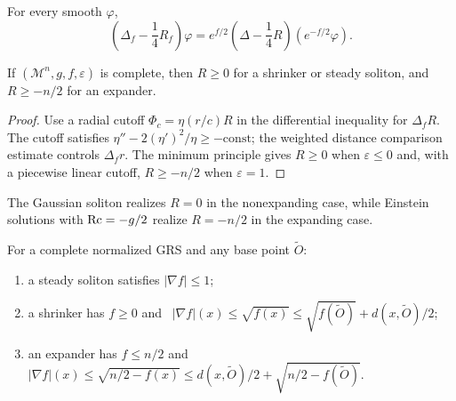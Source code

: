 \begin{claim}
\label{ex:chow-iv-weighted-conjugation}
For every smooth $\varphi$,
\[
\left(\Delta_f-\frac14R_f\right)\varphi
=e^{f/2}\left(\Delta-\frac14R\right)(e^{-f/2}\varphi).
\]
\end{claim}

\begin{theorem}
\label{thm:chow-iv-scalar-curvature-lower-bound}
If $(\mathcal M^n,g,f,\varepsilon)$ is complete, then $R\ge0$ for a shrinker
or steady soliton, and $R\ge-n/2$ for an expander.
\end{theorem}
\begin{proof}
Use a radial cutoff $\Phi_c=\eta(r/c)R$ in the differential inequality for
$\Delta_fR$.  The cutoff satisfies
$\eta''-2(\eta')^2/\eta\ge-\mathrm{const}$; the weighted distance comparison
estimate controls $\Delta_fr$.  The minimum principle gives $R\ge0$ when
$\varepsilon\le0$ and, with a piecewise linear cutoff, $R\ge-n/2$ when
$\varepsilon=1$.
\end{proof}

\begin{remark}
\label{rem:chow-iv-scalar-lower-sharp}
The Gaussian soliton realizes $R=0$ in the nonexpanding case, while Einstein
solutions with $\operatorname{Rc}=-g/2$ realize $R=-n/2$ in the expanding case.
\end{remark}

\begin{theorem}
\label{thm:chow-iv-gradient-potential-bounds}
For a complete normalized GRS and any base point $\widetilde O$:
\begin{enumerate}
\item a steady soliton satisfies $|\nabla f|\le1$;
\item a shrinker has $f\ge0$ and
\ $|\nabla f|(x)\le\sqrt{f(x)}\le\sqrt{f(\widetilde O)}+d(x,\widetilde O)/2$;
\item an expander has $f\le n/2$ and
\ $|\nabla f|(x)\le\sqrt{n/2-f(x)}\le d(x,\widetilde O)/2+\sqrt{n/2-f(\widetilde O)}$.
\end{enumerate}
\end{theorem}

